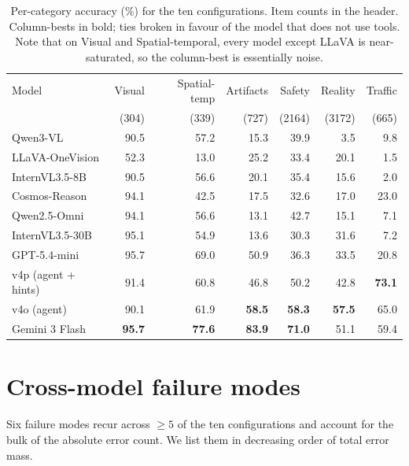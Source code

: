 \documentclass[11pt,a4paper]{article}
\begin{document}
\begin{table}[h]
\centering
\small
\begin{tabular}{lrrrrrr}
\toprule
Model & Visual & Spatial-temp & Artifacts & Safety & Reality & Traffic \\
& {(304)} & {(339)} & {(727)} & {(2164)} & {(3172)} & {(665)} \\
\midrule
Qwen3-VL                & 90.5 & 57.2 & 15.3 & 39.9 &  3.5 &  9.8 \\
LLaVA-OneVision         & 52.3 & 13.0 & 25.2 & 33.4 & 20.1 &  1.5 \\
InternVL3.5-8B          & 90.5 & 56.6 & 20.1 & 35.4 & 15.6 &  2.0 \\
Cosmos-Reason           & 94.1 & 42.5 & 17.5 & 32.6 & 17.0 & 23.0 \\
Qwen2.5-Omni            & 94.1 & 56.6 & 13.1 & 42.7 & 15.1 &  7.1 \\
InternVL3.5-30B         & 95.1 & 54.9 & 13.6 & 30.3 & 31.6 &  7.2 \\
GPT-5.4-mini            & 95.7 & 69.0 & 50.9 & 36.3 & 33.5 & 20.8 \\
v4p (agent + hints)     & 91.4 & 60.8 & 46.8 & 50.2 & 42.8 & \textbf{73.1} \\
v4o (agent)             & 90.1 & 61.9 & \textbf{58.5} & \textbf{58.3} & \textbf{57.5} & 65.0 \\
Gemini 3 Flash          & \textbf{95.7} & \textbf{77.6} & \textbf{83.9} & \textbf{71.0} & 51.1 & 59.4 \\
\bottomrule
\end{tabular}
\caption{Per-category accuracy (\%) for the ten configurations. Item
counts in the header. Column-bests in bold; ties broken in favour of
the model that does not use tools. Note that on Visual and
Spatial-temporal, every model except LLaVA is near-saturated, so the
column-best is essentially noise.}
\label{tab:cat}
\end{table}

\section{Cross-model failure modes}
\label{sec:modes}

Six failure modes recur across $\geq 5$ of the ten configurations and
account for the bulk of the absolute error count. We list them in
decreasing order of total error mass.
\end{document}
